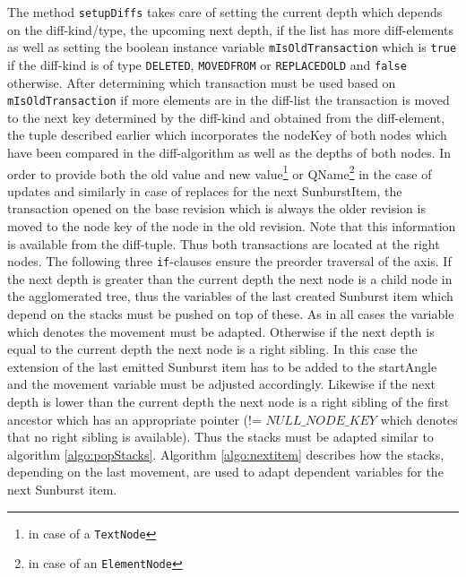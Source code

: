 The method \texttt{setupDiffs} takes care of setting the current depth which depends on the diff-kind/type, the upcoming next depth, if the list has more diff-elements as well as setting the boolean instance variable \texttt{mIsOldTransaction} which is \texttt{true} if the diff-kind is of type \texttt{DELETED}, \texttt{MOVEDFROM} or \texttt{REPLACEDOLD} and \texttt{false} otherwise. After determining which transaction must be used based on \texttt{mIsOldTransaction} if more elements are in the diff-list the transaction is moved to the next key determined by the diff-kind and obtained from the diff-element, the tuple described earlier which incorporates the nodeKey of both nodes which have been compared in the diff-algorithm as well as the depths of both nodes. In order to provide both the old value and new value\footnote{in case of a \texttt{TextNode}} or QName\footnote{in case of an \texttt{ElementNode}} in the case of updates and similarly in case of replaces for the next SunburstItem, the transaction opened on the base revision which is always the older revision is moved to the node key of the node in the old revision. Note that this information is available from the diff-tuple. Thus both transactions are located at the right nodes. The following three \texttt{if}-clauses ensure the preorder traversal of the axis. If the next depth is greater than the current depth the next node is a child node in the agglomerated tree, thus the variables of the last created Sunburst item which depend on the stacks must be pushed on top of these. As in all cases the variable which denotes the movement must be adapted. Otherwise if the next depth is equal to the current depth the next node is a right sibling. In this case the extension of the last emitted Sunburst item has to be added to the startAngle and the movement variable must be adjusted accordingly. Likewise if the next depth is lower than the current depth the next node is a right sibling of the first ancestor which has an appropriate pointer (!= $NULL\_NODE\_KEY$ which denotes that no right sibling is available). Thus the stacks must be adapted similar to algorithm \ref{algo:popStacks}. Algorithm \ref{algo:nextitem} describes how the stacks, depending on the last movement, are used to adapt dependent variables for the next Sunburst item.

